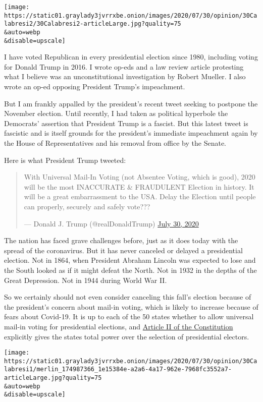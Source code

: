 \texttt{[image: https://static01.graylady3jvrrxbe.onion/images/2020/07/30/opinion/30Calabresi2/30Calabresi2-articleLarge.jpg?quality=75\\\&auto=webp\\\&disable=upscale]}

I have voted Republican in every presidential election since 1980,
including voting for Donald Trump in 2016. I wrote op-eds and a law
review article protesting what I believe was an unconstitutional
investigation by Robert Mueller. I also wrote an op-ed opposing
President Trump's impeachment.

But I am frankly appalled by the president's recent tweet seeking to
postpone the November election. Until recently, I had taken as political
hyperbole the Democrats' assertion that President Trump is a fascist.
But this latest tweet is fascistic and is itself grounds for the
president's immediate impeachment again by the House of Representatives
and his removal from office by the Senate.

Here is what President Trump tweeted:

\begin{quote}
With Universal Mail-In Voting (not Absentee Voting, which is good), 2020
will be the most INACCURATE \& FRAUDULENT Election in history. It will
be a great embarrassment to the USA. Delay the Election until people can
properly, securely and safely vote???

--- Donald J. Trump (@realDonaldTrump)
\href{https://twitter.com/realDonaldTrump/status/1288818160389558273?ref_src=twsrc\%5Etfw}{July
30, 2020}
\end{quote}

The nation has faced grave challenges before, just as it does today with
the spread of the coronavirus. But it has never canceled or delayed a
presidential election. Not in 1864, when President Abraham Lincoln was
expected to lose and the South looked as if it might defeat the North.
Not in 1932 in the depths of the Great Depression. Not in 1944 during
World War II.

So we certainly should not even consider canceling this fall's election
because of the president's concern about mail-in voting, which is likely
to increase because of fears about Covid-19. It is up to each of the 50
states whether to allow universal mail-in voting for presidential
elections, and
\href{https://constitutioncenter.org/interactive-constitution/article/article-ii}{Article
II of the Constitution} explicitly gives the states total power over the
selection of presidential electors.

\texttt{[image: https://static01.graylady3jvrrxbe.onion/images/2020/07/30/opinion/30Calabresi1/merlin\_174987366\_1e15384e-a2a6-4a17-962e-7968fc3552a7-articleLarge.jpg?quality=75\\\&auto=webp\\\&disable=upscale]}

